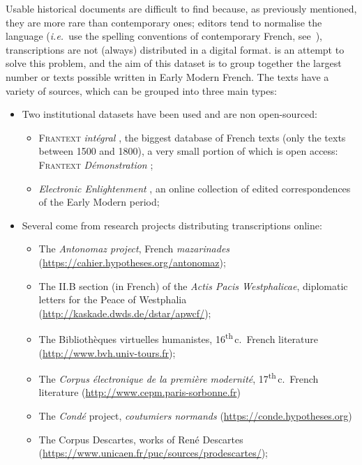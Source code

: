 Usable historical documents are difficult to find because, as previously mentioned, they are more rare than contemporary ones; editors tend to normalise the language (\emph{i.e.}~use the spelling conventions of contemporary French, see~\cite{gabay-2014-pourquoi}), transcriptions are not (always) distributed in a digital format. \freemmax \citep{gabay-etal-2022-FreEM} is an attempt to solve this problem, and the aim of this dataset is to group together the largest number or texts possible written in Early Modern French.
%
The texts have a variety of sources, which can be grouped into three main types:
\begin{itemize}
    \item Two institutional datasets have been used and are non open-sourced:
          \begin{itemize}
              \item \textsc{Frantext} \emph{intégral} \citep{atilf-1998-frantext}, the biggest database of French texts (only the texts between 1500 and 1800), a very small portion of which is open access: \textsc{Frantext} \emph{Démonstration} \citep{atilf-1998-frantext-d};
              \item \emph{Electronic Enlightenment} \citep{bodleian-2008-electronic}, an online collection of edited correspondences of the Early Modern period;
          \end{itemize}
    \item Several come from research projects distributing transcriptions online:
          \begin{itemize}
              \item The \emph{Antonomaz project},  French \emph{mazarinades} (\url{https://cahier.hypotheses.org/antonomaz});
              \item The II.B section (in French) of the \emph{Actis Pacis Westphalicae}, diplomatic letters for the Peace of Westphalia (\url{http://kaskade.dwds.de/dstar/apwcf/});
              \item The Bibliothèques virtuelles humanistes, 16\textsuperscript{th}\,c.~French literature (\url{http://www.bvh.univ-tours.fr});
              \item The \emph{Corpus électronique de la première modernité}, 17\textsuperscript{th}\,c.~French literature (\url{http://www.cepm.paris-sorbonne.fr})
              \item The \emph{Condé} project, \emph{coutumiers normands} (\url{https://conde.hypotheses.org})
              \item The Corpus Descartes, works of René Descartes (\url{https://www.unicaen.fr/puc/sources/prodescartes/});

\end{itemize}
\end{itemize}
